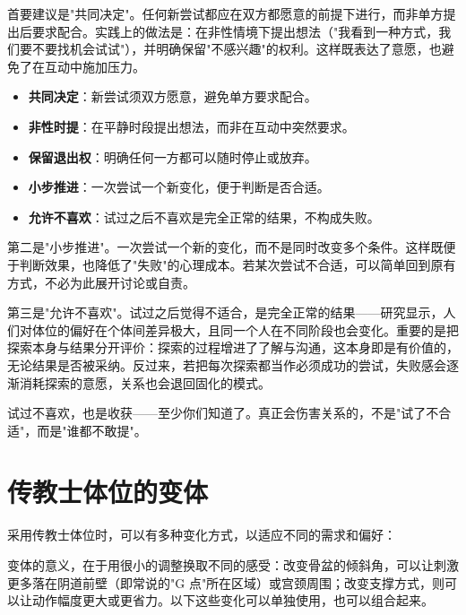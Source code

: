 \documentclass[12pt,UTF8]{ctexbook}
\newcommand{\keyword}[1]{\textbf{#1}}
\begin{document}
首要建议是"共同决定"。任何新尝试都应在双方都愿意的前提下进行，而非单方提出后要求配合。实践上的做法是：在非性情境下提出想法（"我看到一种方式，我们要不要找机会试试"），并明确保留"不感兴趣"的权利。这样既表达了意愿，也避免了在互动中施加压力。

\begin{itemize}
	\item \keyword{共同决定}：新尝试须双方愿意，避免单方要求配合。
	\item \keyword{非性时提}：在平静时段提出想法，而非在互动中突然要求。
	\item \keyword{保留退出权}：明确任何一方都可以随时停止或放弃。
	\item \keyword{小步推进}：一次尝试一个新变化，便于判断是否合适。
	\item \keyword{允许不喜欢}：试过之后不喜欢是完全正常的结果，不构成失败。
\end{itemize}

第二是"小步推进"。一次尝试一个新的变化，而不是同时改变多个条件。这样既便于判断效果，也降低了"失败"的心理成本。若某次尝试不合适，可以简单回到原有方式，不必为此展开讨论或自责。

第三是"允许不喜欢"。试过之后觉得不适合，是完全正常的结果——研究显示，人们对体位的偏好在个体间差异极大，且同一个人在不同阶段也会变化。重要的是把探索本身与结果分开评价：探索的过程增进了了解与沟通，这本身即是有价值的，无论结果是否被采纳。反过来，若把每次探索都当作必须成功的尝试，失败感会逐渐消耗探索的意愿，关系也会退回固化的模式。

\begin{tcolorbox}[colback=pink!5!white,colframe=red!50!black,title=贴心小叮咛]
	试过不喜欢，也是收获——至少你们知道了。真正会伤害关系的，不是"试了不合适"，而是"谁都不敢提"。
\end{tcolorbox}

\vspace{0.5em}
\section{传教士体位的变体}

采用传教士体位时，可以有多种变化方式，以适应不同的需求和偏好：

\vspace{0.5em}

变体的意义，在于用很小的调整换取不同的感受：改变骨盆的倾斜角，可以让刺激更多落在阴道前壁（即常说的"G 点"所在区域）或宫颈周围；改变支撑方式，则可以让动作幅度更大或更省力。以下这些变化可以单独使用，也可以组合起来。
\end{document}
